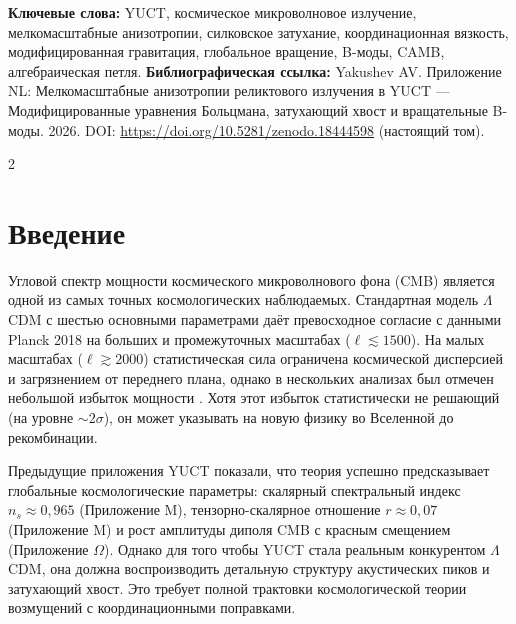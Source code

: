 \documentclass[11pt,a4paper]{article}
\begin{document}
	\vspace{0.1cm}
	\noindent
	{\color{darkblue}\textbf{Ключевые слова:}} YUCT, космическое микроволновое излучение, мелкомасштабные анизотропии, силковское затухание, координационная вязкость, модифицированная гравитация, глобальное вращение, B-моды, CAMB, алгебраическая петля.
	\vspace{0.1cm}
	\noindent
	{\color{darkblue}\textbf{Библиографическая ссылка:}} Yakushev AV. Приложение NL: Мелкомасштабные анизотропии реликтового излучения в YUCT — Модифицированные уравнения Больцмана, затухающий хвост и вращательные B-моды. 2026. DOI: \url{https://doi.org/10.5281/zenodo.18444598} (настоящий том).
	
	\vspace{0.4cm}
	
	\begin{multicols}{2}
		
		\section{Введение}
		
		Угловой спектр мощности космического микроволнового фона (CMB) является одной из самых точных космологических наблюдаемых. Стандартная модель $\Lambda$CDM с шестью основными параметрами даёт превосходное согласие с данными Planck 2018 на больших и промежуточных масштабах ($\ell \lesssim 1500$). На малых масштабах ($\ell \gtrsim 2000$) статистическая сила ограничена космической дисперсией и загрязнением от переднего плана, однако в нескольких анализах был отмечен небольшой избыток мощности \cite{Planck2018}. Хотя этот избыток статистически не решающий (на уровне $\sim2\sigma$), он может указывать на новую физику во Вселенной до рекомбинации.
		
		Предыдущие приложения YUCT показали, что теория успешно предсказывает глобальные космологические параметры: скалярный спектральный индекс $n_s \approx 0,965$ (Приложение M), тензорно-скалярное отношение $r \approx 0,07$ (Приложение M) и рост амплитуды диполя CMB с красным смещением (Приложение $\Omega$). Однако для того чтобы YUCT стала реальным конкурентом $\Lambda$CDM, она должна воспроизводить детальную структуру акустических пиков и затухающий хвост. Это требует полной трактовки космологической теории возмущений с координационными поправками.
		

\end{multicols}
\end{document}
